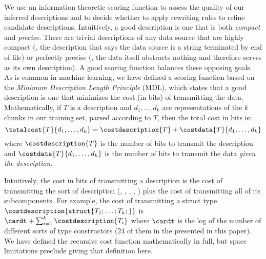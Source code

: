 We use an information theoretic scoring function to assess the quality of 
our inferred descriptions and to decide whether to apply
rewriting rules to refine candidate descriptions.
Intuitively, a good description is one that is both {\em compact} and
{\em precise}.  There are trivial descriptions of any data source
that are highly compact (\eg{}, the description that says
the data source is a string terminated by end of file) or
perfectly precise (\eg{}, the data itself abstracts nothing and
therefore serves as its own description).  A good scoring function
balances these opposing goals.  As is common
in machine learning, we have defined a scoring function based on the
{\em Minimum Description Length Principle} (MDL), which states that
a good description is one that minimizes the cost (in bits) of transmitting
the data.  Mathematically,
if $T$ is a description and $d_1,\ldots,d_k$ are representations of
the $k$ chunks in our training set, parsed according to $T$, then the 
total cost in bits is:
\[
\totalcost{T}{d_1,\ldots,d_k} = \costdescription{T} + \costdata{T}{d_1,\ldots,d_k}
\]
where $\costdescription{T}$ is the number of bits to transmit the
description and $\costdata{T}{d_1,\ldots,d_k}$ is the number of bits
to transmit the data {\em given the description}.

Intuitively, the cost in bits of transmitting a description
is the cost of transmitting the sort of description (\ie{}, ,
, , \etc{}) plus the cost of transmitting all of its
subcomponents.  
For example, the cost of transmitting a struct type
$\costdescription{\mathtt{struct \{} T_1;\ldots ;T_k; \mathtt{\}}}$ is 
$\cardt + \sum_{i=1}^{k} \costdescription{T_i}$
where $\cardt$ is the log of the number of different sorts of type 
constructors (24 of them in the \ir{} presented in this paper).
We have defined the recursive cost function mathematically in full,
but space limitations preclude giving that definition here.

